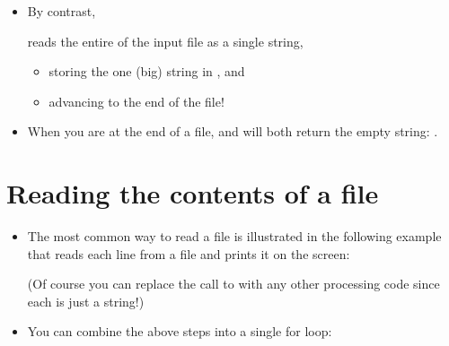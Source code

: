 \documentclass[letterpaper,10pt,english]{sphinxmanual}
\begin{document}
\begin{itemize}
\item {} 
By contrast,

%
\begin{sphinxVerbatim}[commandchars=\\\{\}]
  
\end{sphinxVerbatim}

reads the entire  of the input file as a single string,
\begin{itemize}
\item {} 
storing the one (big) string in , and

\item {} 
advancing  to the end of the file!

\end{itemize}

\item {} 
When you are at the end of a file,  and  will
both return the empty string: .

\end{itemize}


\section{Reading the contents of a file}
\label{\detokenize{lecture_notes/lec13_files_web:reading-the-contents-of-a-file}}\begin{itemize}
\item {} 
The most common way to read a file is illustrated in the following
example that reads each line from a file and prints it on the screen:

%
\begin{sphinxVerbatim}[commandchars=\\\{\}]
  
   
\end{sphinxVerbatim}

(Of course you can replace the call to  with any other
processing code since each  is just a string!)

\item {} 
You can combine the above steps into a single for loop:

%
\begin{sphinxVerbatim}[commandchars=\\\{\}]
   
\end{sphinxVerbatim}

\end{itemize}
\end{document}
